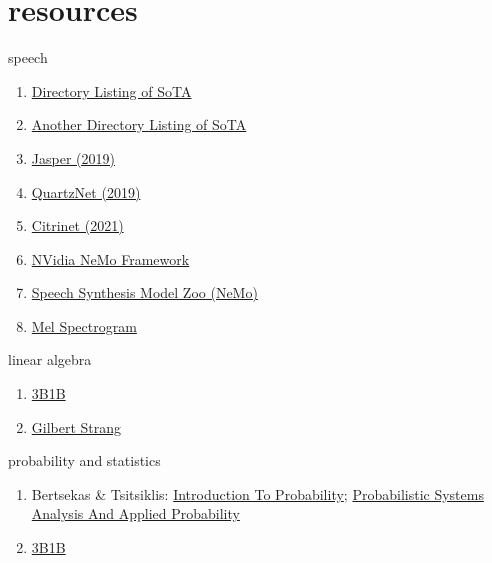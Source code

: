 \documentclass[aspectratio=169,xcolor={dvipsnames,svgnames}]{beamer}
\begin{document}
\section{resources}
\label{resources}
\begin{frame}[label={sec:org3158637}]{speech}
\begin{enumerate}
\item \href{https://github.com/wenet-e2e/speech-synthesis-paper}{Directory Listing of SoTA}
\item \href{https://github.com/zzw922cn/awesome-speech-recognition-speech-synthesis-papers}{Another Directory Listing of SoTA}
\item \href{https://arxiv.org/abs/1904.03288}{Jasper (2019)}
\item \href{https://arxiv.org/abs/1910.10261}{QuartzNet (2019)}
\item \href{https://arxiv.org/abs/2104.01721}{Citrinet (2021)}
\item \href{https://docs.nvidia.com/nemo-framework/user-guide/latest/nemotoolkit/asr/intro.html}{NVidia NeMo Framework}
\item \href{https://docs.nvidia.com/nemo-framework/user-guide/latest/nemotoolkit/tts/intro.html}{Speech Synthesis Model Zoo (NeMo)}
\item \href{https://medium.com/analytics-vidhya/understanding-the-mel-spectrogram-fca2afa2ce53}{Mel Spectrogram}
\end{enumerate}
\end{frame}

\begin{frame}[label={sec:orgbcd2da4}]{linear algebra}
\begin{enumerate}
\item \href{https://www.3blue1brown.com/topics/linear-algebra}{3B1B}
\item \href{https://ocw.mit.edu/courses/18-06-linear-algebra-spring-2010/}{Gilbert Strang}
\end{enumerate}
\end{frame}

\begin{frame}[label={sec:org1f00d65}]{probability and statistics}
\begin{enumerate}
\item Bertsekas \& Tsitsiklis: \href{https://ocw.mit.edu/courses/res-6-012-introduction-to-probability-spring-2018/}{Introduction To
Probability}; \href{https://ocw.mit.edu/courses/6-041sc-probabilistic-systems-analysis-and-applied-probability-fall-2013/}{Probabilistic Systems Analysis And
Applied Probability}
\item \href{https://www.3blue1brown.com/topics/probability}{3B1B}
\end{enumerate}
\end{frame}
\end{document}
